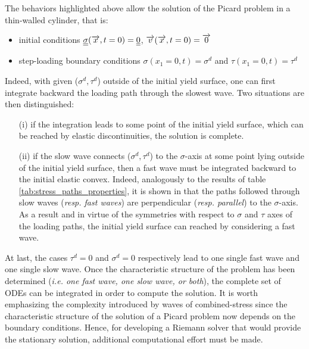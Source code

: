 The behaviors highlighted above allow the solution of the Picard problem in a thin-walled cylinder, that is:
\begin{itemize}
\item initial conditions ${\underline{\underline{\sigma}}}({\overrightarrow{x}},t=0)={\underline{\underline{0}}}$, ${\overrightarrow{v}}({\overrightarrow{x}},t=0)={\overrightarrow{0}}$
\item step-loading boundary conditions $\sigma(x_1=0,t)=\sigma^d$ and $\tau(x_1=0,t)=\tau^d$
\end{itemize}
Indeed, with given ($\sigma^d,\tau^d$) outside of the initial yield surface, one can first integrate backward the loading path through the slowest wave. Two situations are then distinguished:
\begin{itemize}
\item[(i)] if the integration leads to some point of the initial yield surface, which can be reached by elastic discontinuities, the solution is complete.
\item[(ii)] if the slow wave connects ($\sigma^d,\tau^d$) to the $\sigma$-axis at some point lying outside of the initial yield surface, then a fast wave must be integrated backward to the initial elastic convex.
  Indeed, analogously to the results of table \ref{tab:stress_paths_properties}, it is shown in \cite{Clifton} that the paths followed through slow waves (\textit{resp. fast waves}) are perpendicular (\textit{resp. parallel}) to the $\sigma$-axis. 
  As a result and in virtue of the symmetries with respect to $\sigma$ and $\tau$ axes of the loading paths, the initial yield surface can reached by considering a fast wave.  
\end{itemize}
At last, the cases $\tau^d=0$ and $\sigma^d=0$ respectively lead to one single fast wave and one single slow wave.
Once the characteristic structure of the problem has been determined (\textit{i.e. one fast wave, one slow wave, or both}), the complete set of ODEs can be integrated in order to compute the solution.
It is worth emphasizing the complexity introduced by waves of combined-stress since the characteristic structure of the solution of a Picard problem now depends on the boundary conditions.
Hence, for developing a Riemann solver that would provide the stationary solution, additional computational effort must be made.

